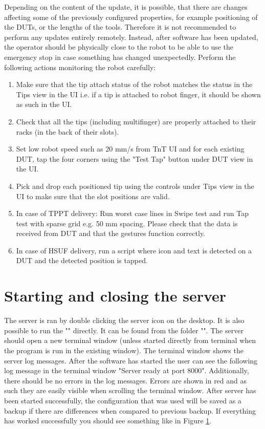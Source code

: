 Depending on the content of the update, it is possible, that there are changes affecting some of the previously configured properties, for example positioning of the DUTs, or the lengths of the tools. Therefore it is not recommended to perform any updates entirely remotely. Instead, after software has been updated, the operator should be physically close to the robot to be able to use the emergency stop in case something has changed unexpectedly. Perform the following actions monitoring the robot carefully:
%
\begin{enumerate}
    \item Make sure that the tip attach status of the robot matches the status in the Tips view in the UI i.e. if a tip is attached to robot finger, it should be shown as such in the UI.
    \item Check that all the tips (including multifinger) are properly attached to their racks (in the back of their slots).
	\item Set low robot speed such as 20 mm/s from TnT UI and for each existing DUT, tap the four corners using the "Test Tap" button under DUT view in the UI.
	\item Pick and drop each positioned tip using the controls under Tips view in the UI to make sure that the slot positions are valid.
	\item In case of TPPT delivery: Run worst case lines in Swipe test and run Tap test with sparse grid e.g. 50 mm spacing. Please check that the data is received from DUT and that the gestures function correctly.
	\item In case of HSUF delivery, run a script where icon and text is detected on a DUT and the detected position is tapped.
\end{enumerate}

\section{Starting and closing the server}
\label{sec:server_start}
The server is ran by double clicking the server icon on the desktop. It is also possible to run the "\tntServerExecutable" directly. It can be found from the folder "\tntRootPath\tntServerFolder". The server should open a new terminal window (unless started directly from terminal when the program is run in the existing window). The terminal window shows the server log messages. After the software has started the user can see the following log message in the terminal window "Server ready at port 8000". Additionally, there should be no errors in the log messages. Errors are shown in red and as such they are easily visible when scrolling the terminal window. After server has been started successfully, the configuration that was used will be saved as a backup if there are differences when compared to previous backup. If everything has worked successfully you should see something like in Figure \ref{sec:server_start}.

